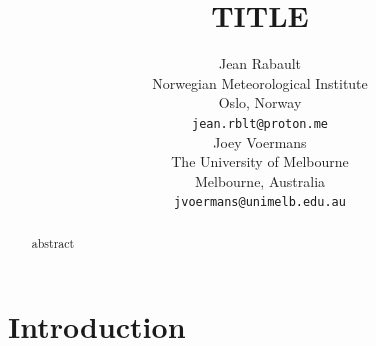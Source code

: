 \documentclass{article}
\title{TITLE}
\author{
  Jean Rabault \\
  Norwegian Meteorological Institute \\
  Oslo, Norway \\
  \texttt{jean.rblt@proton.me} \\
  \And
  Joey Voermans \\
  The University of Melbourne \\
  Melbourne, Australia \\
  \texttt{jvoermans@unimelb.edu.au} \\
}
\begin{document}
\maketitle

\begin{abstract}
abstract
\end{abstract}

\section{Introduction}





\end{document}
